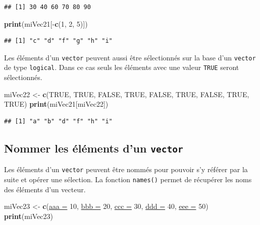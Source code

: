\documentclass[twoside,symmetric]{book}
\newenvironment{Shaded}{}{}
\newcommand{\DataTypeTok}[1]{\underline{#1}}
\newcommand{\DecValTok}[1]{#1}
\newcommand{\KeywordTok}[1]{\textbf{#1}}
\newcommand{\NormalTok}[1]{#1}
\newcommand{\OperatorTok}[1]{#1}
\newcommand{\OtherTok}[1]{#1}
\newcommand{\StringTok}[1]{#1}
\begin{document}
\begin{verbatim}
## [1] 30 40 60 70 80 90
\end{verbatim}

\begin{Shaded}
\begin{Highlighting}[]
\KeywordTok{print}\NormalTok{(miVec21[}\OperatorTok{-}\KeywordTok{c}\NormalTok{(}\DecValTok{1}\NormalTok{, }\DecValTok{2}\NormalTok{, }\DecValTok{5}\NormalTok{)])}
\end{Highlighting}
\end{Shaded}

\begin{verbatim}
## [1] "c" "d" "f" "g" "h" "i"
\end{verbatim}

Les éléments d'un \texttt{vector} peuvent aussi être sélectionnés sur la base d'un \texttt{vector} de type \texttt{logical}. Dans ce cas seuls les éléments avec une valeur \texttt{TRUE} seront sélectionnés.

\begin{Shaded}
\begin{Highlighting}[]
\NormalTok{miVec22 <-}\StringTok{ }\KeywordTok{c}\NormalTok{(}\OtherTok{TRUE}\NormalTok{, }\OtherTok{TRUE}\NormalTok{, }\OtherTok{FALSE}\NormalTok{, }\OtherTok{TRUE}\NormalTok{, }
  \OtherTok{FALSE}\NormalTok{, }\OtherTok{TRUE}\NormalTok{, }\OtherTok{FALSE}\NormalTok{, }\OtherTok{TRUE}\NormalTok{, }\OtherTok{TRUE}\NormalTok{)}
\KeywordTok{print}\NormalTok{(miVec21[miVec22])}
\end{Highlighting}
\end{Shaded}

\begin{verbatim}
## [1] "a" "b" "d" "f" "h" "i"
\end{verbatim}

\hypertarget{nommer-les-uxe9luxe9ments-dun-vector}{%
\subsection{\texorpdfstring{Nommer les éléments d'un \texttt{vector}}{Nommer les éléments d'un vector}}\label{nommer-les-uxe9luxe9ments-dun-vector}}

Les éléments d'un \texttt{vector} peuvent être nommés pour pouvoir s'y référer par la suite et opérer une sélection. La fonction \texttt{names()} permet de récupérer les noms des éléments d'un vecteur.

\begin{Shaded}
\begin{Highlighting}[]
\NormalTok{miVec23 <-}\StringTok{ }\KeywordTok{c}\NormalTok{(}\DataTypeTok{aaa =} \DecValTok{10}\NormalTok{, }\DataTypeTok{bbb =} \DecValTok{20}\NormalTok{, }\DataTypeTok{ccc =} \DecValTok{30}\NormalTok{, }\DataTypeTok{ddd =} \DecValTok{40}\NormalTok{, }\DataTypeTok{eee =} \DecValTok{50}\NormalTok{)}
\KeywordTok{print}\NormalTok{(miVec23)}
\end{Highlighting}
\end{Shaded}
\end{document}
